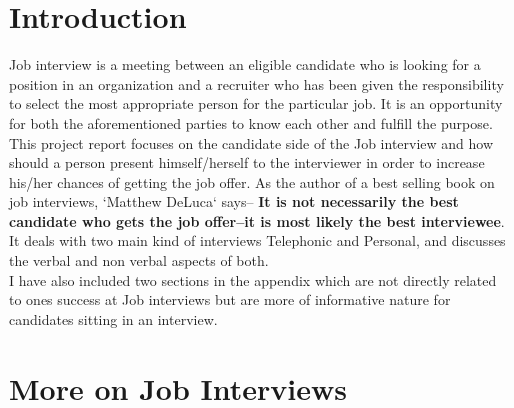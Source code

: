 \documentclass[a4paper,12pt]{report}
\begin{document}
\section{Introduction}             %
Job interview is a meeting between an eligible candidate who is looking for a position in an organization and a recruiter who has been 
given the responsibility to select the most appropriate person for the particular job. It is an opportunity for both the aforementioned 
parties to know each other and fulfill the purpose. \\This project report focuses on the candidate side of the Job interview and how should a person
present himself/herself to the interviewer in order to increase his/her chances of getting the job offer.
As the author of a best selling book on job interviews, `Matthew DeLuca` \cite{matthewluca} says--
{\bf It is not necessarily the best candidate who gets the job offer--it is most likely the best interviewee}. It deals with two
main kind of interviews Telephonic and Personal, and discusses the verbal and non verbal aspects of both.\\
I have also included two sections in the appendix which are not directly related to ones success at Job interviews
but are more of informative nature for candidates sitting in an interview.
\section{More on Job Interviews}       %
\end{document}
